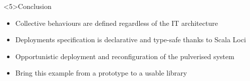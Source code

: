 \begin{frame}<5>{Conclusion}
  \begin{card}[Benefits]
    \begin{itemize}
      \item<1-> Collective behaviours are defined regardless of the IT architecture
      \item<2-> Deployments specification is declarative and type-safe thanks to Scala Loci
    \end{itemize}
  \end{card}
  \pause
  \begin{card}
    \begin{itemize}
      \item <3-> Opportunistic deployment and reconfiguration of the pulverised system
      \item <4-> Bring this example from a prototype to a usable library
    \end{itemize}
  \end{card}
\end{frame}
